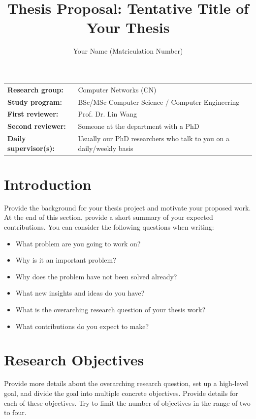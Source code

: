 \documentclass[report]{../upb-cn}
\title{Thesis Proposal: Tentative Title of Your Thesis}
\author{Your Name (Matriculation Number)}
\begin{document}
\makethetitle

\begin{notebox}
    \begin{tabular}{@{}ll}
        \textbf{Research group:} & Computer Networks (CN) \\
        \textbf{Study program:} & BSc/MSc Computer Science / Computer Engineering \\
        \textbf{First reviewer:} & Prof. Dr. Lin Wang \\
        \textbf{Second reviewer:} & Someone at the department with a PhD \\
        \textbf{Daily supervisor(s):} & Usually our PhD researchers who talk to you on a daily/weekly basis
    \end{tabular}
\end{notebox}

\section{Introduction}
\label{sec:introduction}

Provide the background for your thesis project and motivate your proposed work. At the end of this section, provide a short summary of your expected contributions. You can consider the following questions when writing:

\begin{itemize}
    \item What problem are you going to work on?
    \item Why is it an important problem?
    \item Why does the problem have not been solved already?
    \item What new insights and ideas do you have?
    \item What is the overarching research question of your thesis work?
    \item What contributions do you expect to make? 
\end{itemize}

\section{Research Objectives}
\label{sec:objectives}

Provide more details about the overarching research question, set up a high-level goal, and divide the goal into multiple concrete objectives. Provide details for each of these objectives. Try to limit the number of objectives in the range of two to four. 
\end{document}

